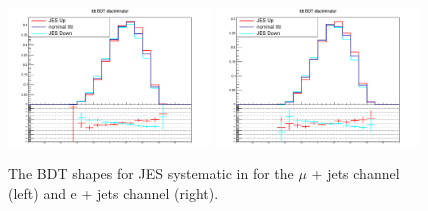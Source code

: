 \begin{figure}[ht!]
    \includegraphics[width=0.48\textwidth]{images/Run2/Sys/JESsystttt.pdf}
    \includegraphics[width=0.48\textwidth]{images/Run2/Sys/JESsystttt_e.pdf}     
    \caption{The BDT shapes for JES systematic in \tttt for the $\mu$ + jets channel (left) and e + jets channel (right).}
    \label{fig:SysShapesJEStttt}
\end{figure}

